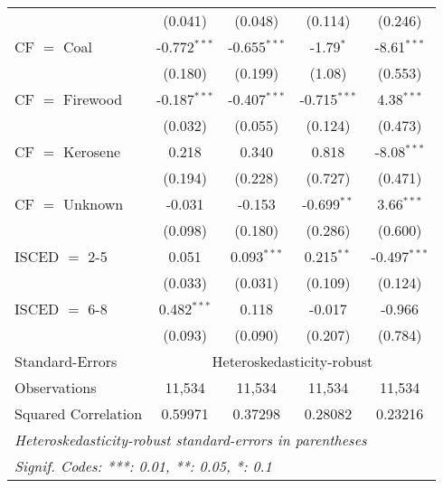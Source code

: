 \begin{table}[htbp!]
\begin{adjustbox}{width = 1\textwidth, max height = 0.95\textheight, center}
\begin{threeparttable}[b]
\begin{tabular}{lcccc}
                                 & (0.041)            & (0.048)            & (0.114)        & (0.246)\\   
            CF $=$ Coal          & -0.772$^{***}$     & -0.655$^{***}$     & -1.79$^{*}$    & -8.61$^{***}$\\   
                                 & (0.180)            & (0.199)            & (1.08)         & (0.553)\\   
            CF $=$ Firewood      & -0.187$^{***}$     & -0.407$^{***}$     & -0.715$^{***}$ & 4.38$^{***}$\\   
                                 & (0.032)            & (0.055)            & (0.124)        & (0.473)\\   
            CF $=$ Kerosene      & 0.218              & 0.340              & 0.818          & -8.08$^{***}$\\   
                                 & (0.194)            & (0.228)            & (0.727)        & (0.471)\\   
            CF $=$ Unknown       & -0.031             & -0.153             & -0.699$^{**}$  & 3.66$^{***}$\\   
                                 & (0.098)            & (0.180)            & (0.286)        & (0.600)\\   
            ISCED $=$ 2-5        & 0.051              & 0.093$^{***}$      & 0.215$^{**}$   & -0.497$^{***}$\\   
                                 & (0.033)            & (0.031)            & (0.109)        & (0.124)\\   
            ISCED $=$ 6-8        & 0.482$^{***}$      & 0.118              & -0.017         & -0.966\\   
                                 & (0.093)            & (0.090)            & (0.207)        & (0.784)\\   
            \midrule 
            Standard-Errors & \multicolumn{4}{c}{Heteroskedasticity-robust} \\ 
            Observations         & 11,534             & 11,534             & 11,534         & 11,534\\  
            Squared Correlation  & 0.59971            & 0.37298            & 0.28082        & 0.23216\\  
            \midrule \midrule
            \multicolumn{5}{l}{\emph{Heteroskedasticity-robust standard-errors in parentheses}}\\
            \multicolumn{5}{l}{\emph{Signif. Codes: ***: 0.01, **: 0.05, *: 0.1}}\\
         \end{tabular}
         

\end{threeparttable}
\end{adjustbox}
\end{table}
